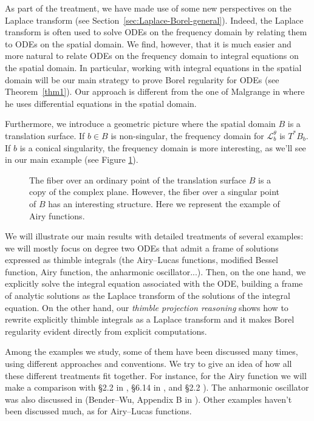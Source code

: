 \documentclass{article}
\theoremstyle{definition}
\newcommand{\laplace}{\mathcal{L}}
\begin{document}
As part of the treatment, we have made use of some new perspectives on the Laplace transform (see Section~\ref{sec:Laplace-Borel-general}). Indeed, the Laplace transform is often used to solve ODEs on the frequency domain by relating them to ODEs on the spatial domain. We find, however, that it is much easier and more natural to relate ODEs on the frequency domain to integral equations on the spatial domain. In particular, working with integral equations in the spatial domain will be our main strategy to prove Borel regularity for ODEs (see Theorem~\ref{thm1}). Our approach is different from the one of Malgrange in \cite{malgrange--fourier} where he uses differential equations in the spatial domain. 

Furthermore, we introduce a geometric picture where the spatial domain $B$ is a translation surface. If $b \in B$ is non-singular, the frequency domain for $\laplace_b^\theta$ is $T^* B_b$. If $b$ is a conical singularity, the frequency domain is more interesting, as we'll see in our main example (see Figure \ref{fig:different_fibres}). 


\begin{figure}[h]
    \centering
    \caption{The fiber over an ordinary point of the translation surface $B$ is a copy of the complex plane. However, the fiber over a singular point of $B$ has an interesting structure. Here we represent the example of Airy functions.}
    \label{fig:different_fibres}
\end{figure}

We will illustrate our main results with detailed treatments of several examples: we will mostly focus on degree two ODEs that admit a frame of solutions expressed as thimble integrals (the Airy--Lucas functions, modified Bessel function, Airy function, the anharmonic oscillator...). Then, on the one hand, we explicitly solve the integral equation associated with the ODE, building a frame of analytic solutions as the Laplace transform of the solutions of the integral equation. On the other hand, our \textit{thimble projection reasoning} shows how to rewrite explicitly thimble integrals as a Laplace transform and it makes Borel regularity evident directly from explicit computations.

Among the examples we study, some of them have been discussed many times, using different approaches and conventions. We try to give an idea of how all these different treatments fit together. For instance, for the Airy function we will make a comparison with \S 2.2 in \cite{lectures-Marino}, \S 6.14 in \cite{diverg-resurg-i}, and \S 2.2 \cite{kawai-takei}). The anharmonic oscillator was also discussed in (Bender--Wu, Appendix B in \cite{aniceto2019primer}). Other examples haven't been discussed much, as for Airy--Lucas functions. 
\end{document}
